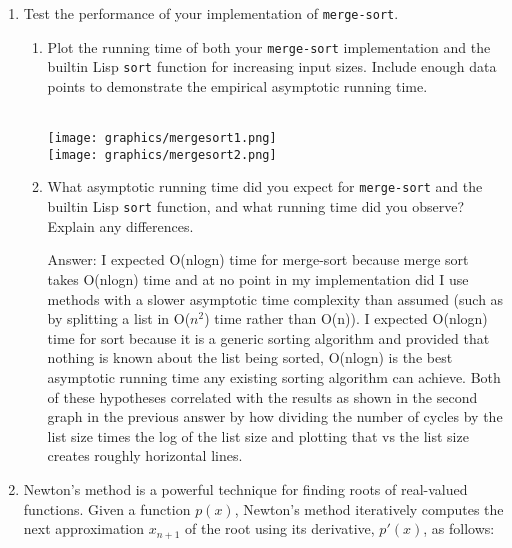 \documentclass[12pt,letterpaper]{ntdhw}
\begin{document}
\begin{enumerate}
\begin{enumerate}
  \end{enumerate}

  \item Test the performance of your implementation of
    \texttt{merge-sort}.
    \begin{enumerate}

    \item Plot the running time of both your \texttt{merge-sort}
      implementation and the builtin Lisp \texttt{sort} function for
      increasing input sizes.  Include enough data points to
      demonstrate the empirical asymptotic running time.

    \begin{emph}
      \\
      \texttt{[image: graphics/mergesort1.png]} 
      \\
      \texttt{[image: graphics/mergesort2.png]}
    \end{emph}

  \item What asymptotic running time did you expect for
    \texttt{merge-sort} and the builtin Lisp \texttt{sort} function, and
    what running time did you observe?  Explain any differences.

    \begin{emph}
      Answer: I expected O(nlogn) time for merge-sort because merge sort takes O(nlogn) time and at no point in my implementation did I use methods with a slower asymptotic time complexity than assumed (such as by splitting a list in O($n^2$) time rather than O(n)). I expected O(nlogn) time for sort because it is a generic sorting algorithm and provided that nothing is known about the list being sorted, O(nlogn) is the best asymptotic running time any existing sorting algorithm can achieve. Both of these hypotheses correlated with the results as shown in the second graph in the previous answer by how dividing the number of cycles by the list size times the log of the list size and plotting that vs the list size creates roughly horizontal lines.
    \end{emph}

    \end{enumerate}

    \item Newton's method is a powerful technique for finding roots of real-valued functions. Given a function \( p(x) \), Newton's method iteratively computes the next approximation \( x_{n+1} \) of the root using its derivative, \( p'(x) \), as follows:


\end{enumerate}
\end{document}
